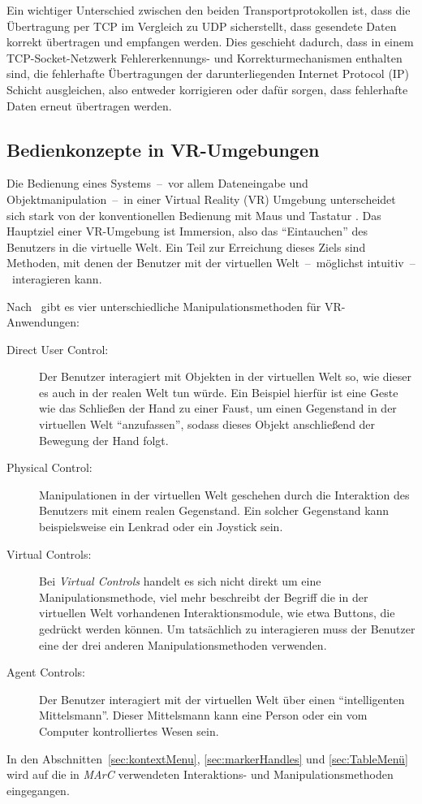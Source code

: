 Ein wichtiger Unterschied zwischen den beiden Transportprotokollen ist, dass die Übertragung per TCP im Vergleich zu UDP sicherstellt, dass gesendete Daten korrekt übertragen und empfangen werden. Dies geschieht dadurch, dass in einem TCP-Socket-Netzwerk Fehlererkennungs- und Korrekturmechanismen enthalten sind, die fehlerhafte Übertragungen der darunterliegenden Internet Protocol (IP) Schicht ausgleichen, also entweder korrigieren oder dafür sorgen, dass fehlerhafte Daten erneut übertragen werden.

\subsection{Bedienkonzepte in VR-Umgebungen}\label{sec:MenüAnwendungen}
Die Bedienung eines Systems~--~vor allem Dateneingabe und Objektmanipulation~--~in einer Virtual Reality (VR) Umgebung unterscheidet sich stark von der konventionellen Bedienung mit Maus und Tastatur \cite{chu1997multi}. Das Hauptziel einer VR-Umgebung ist Immersion, also das "`Eintauchen"' des Benutzers in die virtuelle Welt. Ein Teil zur Erreichung dieses Ziels sind Methoden, mit denen der Benutzer mit der virtuellen Welt~--~möglichst intuitiv~--~interagieren kann.

Nach~\cite{sherman2002understanding} gibt es vier unterschiedliche Manipulationsmethoden für VR-An\-wen\-dung\-en:
\begin{description}
	\item[Direct User Control:] Der Benutzer interagiert mit Objekten in der virtuellen Welt so, wie dieser es auch in der realen Welt tun würde. Ein Beispiel hierfür ist eine Geste wie das Schließen der Hand zu einer Faust, um einen Gegenstand in der virtuellen Welt "`anzufassen"', sodass dieses Objekt anschließend der Bewegung der Hand folgt.
	\item[Physical Control:] Manipulationen in der virtuellen Welt geschehen durch die Interaktion des Benutzers mit einem realen Gegenstand. Ein solcher Gegenstand kann beispielsweise ein Lenkrad oder ein Joystick sein.
	\item[Virtual Controls:] Bei \emph{Virtual Controls} handelt es sich nicht direkt um eine Manipulationsmethode, viel mehr beschreibt der Begriff die in der virtuellen Welt vorhandenen Interaktionsmodule, wie etwa Buttons, die gedrückt werden können. Um tatsächlich zu interagieren muss der Benutzer eine der drei anderen Manipulationsmethoden verwenden.
	\item[Agent Controls:] Der Benutzer interagiert mit der virtuellen Welt über einen "`intelligenten Mittelsmann"'. Dieser Mittelsmann kann eine Person oder ein vom Computer kontrolliertes Wesen sein.
\end{description}
In den Abschnitten~\ref{sec:kontextMenu}, \ref{sec:markerHandles} und \ref{sec:TableMenü} wird auf die in \emph{MArC} verwendeten Interaktions- und Manipulationsmethoden eingegangen.

